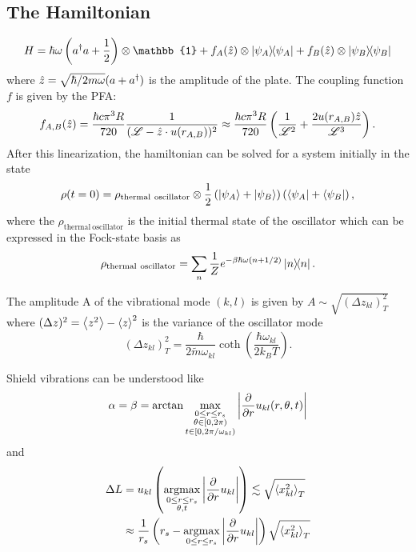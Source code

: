\subsection{The Hamiltonian}
\begin{equation}
  H = \hbar \omega \left(a^\dagger a + \frac{1}{2}\right) \otimes \mathbb{1} + f_A(\op{z})\otimes\ketbra{\psi_A} + f_B(\op{z})\otimes\ketbra{\psi_B}
\end{equation}
where $\hat{z} = \sqrt{\hbar/2m\omega}(a + a^\dagger)$ is the amplitude of the plate. The coupling function $f$ is given by the PFA:
\begin{equation}
  f_{A,B}(\hat{z}) = \frac{\hbar c \pi^3 R}{720} \frac{1}{(\mathscr{L}-\hat{z}\cdot u(r_{A,B}))^2} \approx \frac{\hbar c \pi^3 R}{720} \left(\frac{1}{\mathscr{L}^2} + \frac{2 u(r_{A,B}) \hat{z}}{\mathscr{L}^3}\right) .
\end{equation}
After this linearization, the hamiltonian can be solved for a system initially in the state
\begin{equation}
  \rho(t=0) = \rho_\mathrm{thermal\ oscillator}\otimes \frac{1}{2} \left(\ket{\psi_A} + \ket{\psi_B}\right)\left(\bra{\psi_A} + \bra{\psi_B}\right),
\end{equation}
where the $\rho_\mathrm{thermal\ oscillator}$ is the initial thermal state of the oscillator which can be expressed in the Fock-state basis as
\begin{equation}
  \rho_\mathrm{thermal\ oscillator} = \sum_{n} \frac{1}{Z} e^{-\beta \hbar \omega(n + 1/2)} \ketbra{n}.
\end{equation}




The amplitude A of the vibrational mode $(k,l)$ is given by $A \sim \sqrt{(\Delta z_{kl})^2_T}$ where $(\Delta z)^2 = \left\langle z^2\right\rangle - \left\langle z\right\rangle^2$ is the variance of the oscillator mode
\begin{equation}
  (\Delta z_{kl})^2_T = \frac{\hbar}{2\tilde{m}\omega_{kl}} \coth(\frac{\hbar \omega_{kl}}{2 k_B T}) .
\end{equation}

Shield vibrations can be understood like
\begin{equation}
  \alpha = \beta = \arctan{\max_{\substack{0 \leq r \leq r_s \\ \theta \in[0, 2\pi) \\ t \in [0,2\pi/\omega_{kl})}} \left\lvert\pdv{r}u_{kl}(r,\theta,t)\right\rvert}
\end{equation}
and
\begin{align}
  \Delta L &= u_{kl}\left(\operatorname*{arg max}_{\substack{0 \leq r \leq r_s \\ \theta, t}} \left\lvert\pdv{r}u_{kl}\right\rvert \right) \lesssim \sqrt{\left\langle x_{kl}^2\right\rangle_T} \\
  &\approx \frac{1}{r_s} \left(r_s - \operatorname*{arg max}_{0 \leq r \leq r_s}\left\lvert\pdv{r}u_{kl}\right\rvert\right)\sqrt{\left\langle x_{kl}^2\right\rangle_T}
\end{align}


